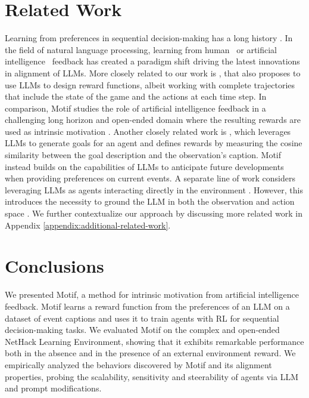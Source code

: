 \documentclass{article} %
\begin{document}
\section{Related Work}
Learning from preferences in sequential decision-making has a long history \citep{thomaz2006reinforcement,knox2009interactively}. In the field of natural language processing, learning from human~\citep{ouyang2022training} or artificial intelligence~\citep{bai2022constitutional} feedback has created a paradigm shift driving the latest innovations in alignment of LLMs. 
More closely related to our work is 
 \citet{kwon2022reward}, that also proposes to use LLMs to design reward functions, albeit
working with complete trajectories that include the state of the game and the actions at each time step.
 In comparison, Motif studies the role of artificial intelligence feedback in a challenging long horizon and open-ended domain where the resulting rewards are used as intrinsic motivation \citep{Schmidhuber1991APF}. 
 Another closely related work is \citet{DBLP:conf/icml/DuWWCDA0A23}, which leverages LLMs to generate goals for an agent and defines rewards by measuring the cosine similarity between the goal description and the observation's caption. 
 Motif instead builds on the capabilities of LLMs to anticipate future developments when providing preferences on current events.
 A separate line of work considers leveraging LLMs as agents interacting directly in the environment \citep{yao2022react,wang2023voyager}. However, this introduces the necessity to ground the LLM in both the observation and action space \citep{carta2023grounding}. We further contextualize our approach by discussing more related work in Appendix \ref{appendix:additional-related-work}.

\section{Conclusions}
We presented Motif, a method for intrinsic motivation from artificial intelligence feedback.
Motif learns a reward function from the preferences of an LLM on a dataset of event captions and uses it to train agents with RL for sequential decision-making tasks.
We evaluated Motif on the complex and open-ended NetHack Learning Environment, showing that it exhibits remarkable performance both in the absence and in the presence of an external environment reward.
We empirically analyzed the behaviors discovered by Motif and its alignment properties, probing the scalability, sensitivity and steerability of agents via LLM and prompt modifications.
\end{document}
